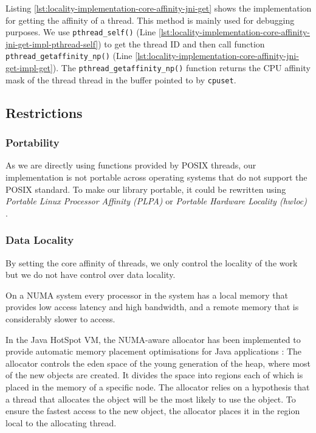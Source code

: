 Listing \ref{lst:locality-implementation-core-affinity-jni-get} shows
the implementation for getting the affinity of a thread. This method
is mainly used for debugging purposes. We use
\lstinline!pthread_self()! (Line
\ref{lst:locality-implementation-core-affinity-jni-get-impl-pthread-self})
to get the thread ID and then call function
\lstinline!pthread_getaffinity_np()!  (Line
\ref{lst:locality-implementation-core-affinity-jni-get-impl-get}). The
\lstinline!pthread_getaffinity_np()! function returns the CPU affinity
mask of the thread thread in the buffer pointed to by
\lstinline!cpuset!.



\subsection{Restrictions}
\label{sec:locality-implementation-core-affinity-restrictions}

\subsubsection{Portability}

As we are directly using functions provided by POSIX threads, our
implementation is not portable across operating systems that do not
support the POSIX standard. To make our library portable, it could be
rewritten using \emph{Portable Linux Processor Affinity (PLPA)}
\cite{OpenMPI2010a} or \emph{Portable Hardware Locality (hwloc)}
\cite{OpenMPI2010}.

\subsubsection{Data Locality}

By setting the core affinity of threads, we only control the locality
of the work but we do not have control over data locality.

On a NUMA system every processor in the system has a local memory that
provides low access latency and high bandwidth, and a remote memory
that is considerably slower to access.

In the Java HotSpot VM, the NUMA-aware allocator has been implemented
to provide automatic memory placement optimisations for Java
applications \cite{Masamitsu2008, Oracle2010, Humble2010}: The
allocator controls the eden space of the young generation of the heap,
where most of the new objects are created. It divides the space into
regions each of which is placed in the memory of a specific node. The
allocator relies on a hypothesis that a thread that allocates the
object will be the most likely to use the object. To ensure the
fastest access to the new object, the allocator places it in the
region local to the allocating thread.


